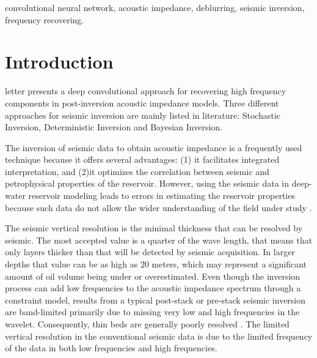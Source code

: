 \documentclass[journal]{IEEEtran}
\begin{document}
\begin{IEEEkeywords}
convolutional neural network, acoustic impedance, deblurring, seismic inversion, frequency recovering.
\end{IEEEkeywords}

\IEEEpeerreviewmaketitle



\section{Introduction}

 letter presents a deep convolutional
approach for recovering high frequency components in
post-inversion acoustic impedance models.
Three different approaches for seismic inversion are mainly listed in 
literature: Stochastic Inversion, Deterministic Inversion and 
Bayesian Inversion.

The inversion of
seismic data to obtain acoustic impedance is a frequently
used technique because it offers several advantages: (1) it
facilitates integrated interpretation, 
and (2)it optimizes the correlation between seismic and petrophysical
properties of the reservoir. However, using the seismic data in
deep-water reservoir modeling leads to errors in estimating
the reservoir properties because such data do not allow the
wider understanding of the field under study \cite{Sergio2016}.

The seismic vertical resolution is the minimal thickness that
can be resolved by seismic. The most accepted value is a quarter
of the wave length, that means that only layers thicker than
that will be detected by seismic acquisition. In larger depths
that value can be as high as $20$ meters, which may represent a
significant amount of oil volume being under or overestimated.
Even though the inversion
process can add low frequencies to the acoustic impedance
spectrum through a constraint model, results from a typical
post-stack or pre-stack seismic inversion are band-limited
primarily due to missing very low and high frequencies in the
wavelet. Consequently, thin beds are generally poorly resolved
\cite{Zhang2012}. The limited vertical resolution in the
conventional seismic data is due to the limited frequency of
the data in both low frequencies and high frequencies.
\end{document}
